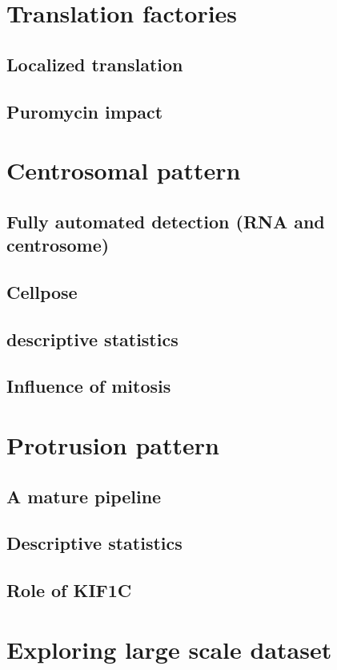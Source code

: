 \section{Translation factories}


\subsection{Localized translation}

\subsection{Puromycin impact}


\section{Centrosomal pattern}


\subsection{Fully automated detection (\ac{RNA} and centrosome)}

\subsection{Cellpose}

\subsection{descriptive statistics}

\subsection{Influence of mitosis}


\section{Protrusion pattern}


\subsection{A mature pipeline}

\subsection{Descriptive statistics}

\subsection{Role of KIF1C}


\section{Exploring large scale dataset}
